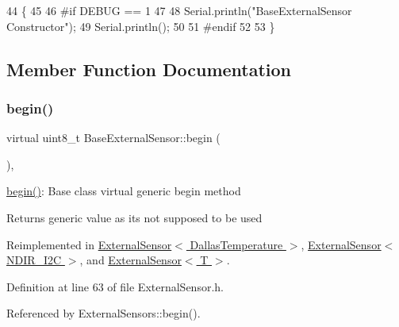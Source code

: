 \begin{DoxyCode}
44     \{
45 
46 \textcolor{preprocessor}{    #if DEBUG == 1 }
47 
48         Serial.println(\textcolor{stringliteral}{"BaseExternalSensor Constructor"});
49         Serial.println();
50     
51 \textcolor{preprocessor}{    #endif}
52 
53     \}
\end{DoxyCode}


\subsection{Member Function Documentation}
\mbox{\label{classBaseExternalSensor_a87d132803d4f4fdd4e66332809f0c9a0}} 
\subsubsection{\texorpdfstring{begin()}{begin()}}
{\footnotesize\ttfamily virtual uint8\+\_\+t Base\+External\+Sensor\+::begin (\begin{DoxyParamCaption}{ }\end{DoxyParamCaption})\hspace{0.3cm}{\ttfamily [inline]}, {\ttfamily [virtual]}}

\hyperlink{classBaseExternalSensor_a87d132803d4f4fdd4e66332809f0c9a0}{begin()}\+: Base class virtual generic begin method

\begin{DoxyReturn}{Returns}
generic value as it\textquotesingle{}s not supposed to be used 
\end{DoxyReturn}


Reimplemented in \hyperlink{classExternalSensor_3_01DallasTemperature_01_4_ac5275129b05e2ff8df45d5b222a661d9}{External\+Sensor$<$ Dallas\+Temperature $>$}, \hyperlink{classExternalSensor_3_01NDIR__I2C_01_4_ac6f3614d94968ef0cc11b2b4d69cef03}{External\+Sensor$<$ N\+D\+I\+R\+\_\+\+I2\+C $>$}, and \hyperlink{classExternalSensor_ab6fe1379d55b656a048e0fba1e0a32e6}{External\+Sensor$<$ T $>$}.



Definition at line 63 of file External\+Sensor.\+h.



Referenced by External\+Sensors\+::begin().


